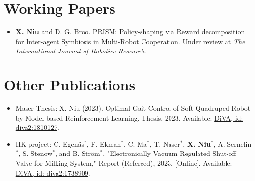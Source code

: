 \documentclass[a4paper,11pt]{article}
\newcommand{\resumeSubHeadingListStart}{\begin{itemize}[leftmargin=*,labelsep=0mm,itemsep=-2pt]}
\newcommand{\resumeSubHeadingListEnd}{\end{itemize}\vspace{2mm}}
\begin{document}
\section{\textbf{Working Papers}}
\resumeSubHeadingListStart
\vspace{3mm}
  \item \hspace{0.3mm} \textbf{X. Niu} and D. G. Broo. PRISM: Policy-shaping via Reward decomposition for Inter-agent Symbiosis in Multi-Robot Cooperation. Under review at \textit{The International Journal of Robotics Research}.
\resumeSubHeadingListEnd
\vspace{-5.5mm}

\section{\textbf{Other Publications}}
\resumeSubHeadingListStart
\vspace{3mm}
  \item \hspace{0.3mm} Maser Thesis: X. Niu (2023). Optimal Gait Control of Soft Quadruped Robot by Model-based Reinforcement Learning. Thesis, 2023. Available: \href{https://urn.kb.se/resolve?urn=urn:nbn:se:kth:diva-339056}{DiVA, id: diva2:1810127}.
  
  \item \hspace{0.3mm} HK project: C. Egenäs$^*$, F. Ekman$^*$, C. Ma$^*$, T. Naser$^*$, \textbf{X. Niu}$^*$, A. Sernelin$^*$, S. Stenow$^*$, and B. Ström$^*$, "Electronically Vacuum Regulated Shut-off Valve for Milking System," Report (Refereed), 2023. [Online]. Available: \href{https://urn.kb.se/resolve?urn=urn:nbn:se:kth:diva-324226}{DiVA, id: diva2:1738909}.
\resumeSubHeadingListEnd
\vspace{-5.5mm}

\end{document}
